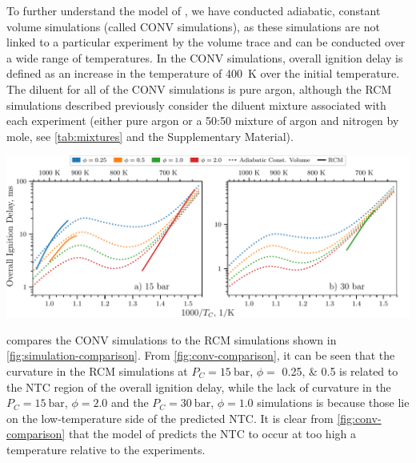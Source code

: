 \documentclass[letterpaper, review, sort&compress]{elsarticle}
\begin{document}
To further understand the model of \citet{Dievart2013}, we have conducted adiabatic, constant volume
simulations (called CONV simulations), as these simulations are not linked to a particular
experiment by the volume trace and can be conducted over a wide range of temperatures. In the CONV
simulations, overall ignition delay is defined as an increase in the temperature of \SI{400}{\K}
over the initial temperature. The diluent for all of the CONV simulations is pure argon, although
the RCM simulations described previously consider the diluent mixture associated with each
experiment (either pure argon or a 50:50 mixture of argon and nitrogen by mole, see
\cref{tab:mixtures} and the Supplementary Material).

\begin{center}
    \captionsetup{type=figure}
    \includegraphics[width=\textwidth]{figures/constant-volume-comparison.pdf}
    \caption{Comparison of simulated overall ignition delays computed in an adiabatic, constant
    volume system (dotted lines) and computed using the procedure described in
    \cref{sec:experimental-modeling} (solid lines). a) \SI{15}{\bar}, b) \SI{30}{\bar}.}
    \label{fig:conv-comparison}
\end{center}

 compares the CONV simulations to the RCM simulations shown in
\cref{fig:simulation-comparison}. From \cref{fig:conv-comparison}, it can be seen that the curvature
in the RCM simulations at \(P_C = \SI{15}{\bar}\), \(\phi =\) \numlist{0.25;0.5} is related to the
NTC region of the overall ignition delay, while the lack of curvature in the \(P_C =
\SI{15}{\bar}\), \(\phi = \num{2.0}\) and the \(P_C = \SI{30}{\bar}\), \(\phi = \num{1.0}\)
simulations is because those lie on the low-temperature side of the predicted NTC. It is clear from
\cref{fig:conv-comparison} that the model of \citet{Dievart2013} predicts the NTC to occur at too
high a temperature relative to the experiments.
\end{document}
